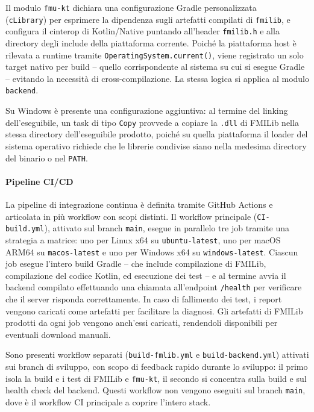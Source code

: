 Il modulo \texttt{fmu-kt} dichiara una configurazione Gradle personalizzata \\(\texttt{cLibrary}) per esprimere la dipendenza sugli artefatti compilati di \texttt{fmilib}, e configura il cinterop di Kotlin/Native puntando all'header \texttt{fmilib.h} e alla directory degli include della piattaforma corrente. Poiché la piattaforma host è rilevata a runtime tramite \texttt{OperatingSystem.current()}, viene registrato un solo target nativo per build -- quello corrispondente al sistema su cui si esegue Gradle -- evitando la necessità di cross-compilazione. La stessa logica si applica al modulo \texttt{backend}.

Su Windows è presente una configurazione aggiuntiva: al termine del linking dell'eseguibile, un task di tipo \texttt{Copy} provvede a copiare la \texttt{.dll} di FMILib nella stessa directory dell'eseguibile prodotto, poiché su quella piattaforma il loader del sistema operativo richiede che le librerie condivise siano nella medesima directory del binario o nel \texttt{PATH}.

\paragraph{Pipeline CI/CD}

La pipeline di integrazione continua è definita tramite GitHub Actions e articolata in più workflow con scopi distinti. Il workflow principale (\texttt{CI-build.yml}), attivato sul branch \texttt{main}, esegue in parallelo tre job tramite una strategia a matrice: uno per Linux x64 su \texttt{ubuntu-latest}, uno per macOS ARM64 su \texttt{macos-latest} e uno per Windows x64 su \texttt{windows-latest}. Ciascun job esegue l'intero build Gradle -- che include compilazione di FMILib, compilazione del codice Kotlin, ed esecuzione dei test -- e al termine avvia il backend compilato effettuando una chiamata all'endpoint \texttt{/health} per verificare che il server risponda correttamente. In caso di fallimento dei test, i report vengono caricati come artefatti per facilitare la diagnosi. Gli artefatti di FMILib prodotti da ogni job vengono anch'essi caricati, rendendoli disponibili per eventuali download manuali.

Sono presenti workflow separati (\texttt{build-fmlib.yml} e \texttt{build-backend.yml}) attivati sui branch di sviluppo, con scopo di feedback rapido durante lo sviluppo: il primo isola la build e i test di FMILib e \texttt{fmu-kt}, il secondo si concentra sulla build e sul health check del backend. Questi workflow non vengono eseguiti sul branch \texttt{main}, dove è il workflow CI principale a coprire l'intero stack.

